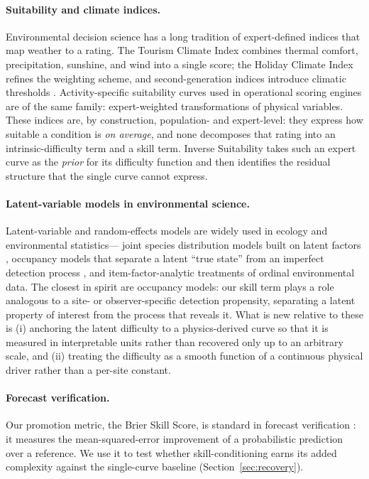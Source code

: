 \paragraph{Suitability and climate indices.} Environmental decision science has a
long tradition of expert-defined indices that map weather to a rating. The Tourism
Climate Index \citep{mieczkowski1985} combines thermal comfort, precipitation,
sunshine, and wind into a single score; the Holiday Climate Index
\citep{scott2016} refines the weighting scheme, and second-generation indices
introduce climatic thresholds \citep{defreitas2008}. Activity-specific suitability
curves used in operational scoring engines are of the same family: expert-weighted
transformations of physical variables. These indices are, by construction,
population- and expert-level: they express how suitable a condition is
\emph{on average}, and none decomposes that rating into an intrinsic-difficulty
term and a skill term. Inverse Suitability takes such an expert curve as the
\emph{prior} for its difficulty function and then identifies the residual
structure that the single curve cannot express.

\paragraph{Latent-variable models in environmental science.} Latent-variable and
random-effects models are widely used in ecology and environmental statistics---
joint species distribution models built on latent factors \citep{warton2015},
occupancy models that separate a latent ``true state'' from an imperfect detection
process \citep{mackenzie2002}, and item-factor-analytic treatments of ordinal
environmental data. The closest in spirit are occupancy models: our skill term
plays a role analogous to a site- or observer-specific detection propensity,
separating a latent property of interest from the process that reveals it. What is
new relative to these is (i) anchoring the latent difficulty to a physics-derived
curve so that it is measured in interpretable units rather than recovered only up
to an arbitrary scale, and (ii) treating the difficulty as a smooth function of a
continuous physical driver rather than a per-site constant.

\paragraph{Forecast verification.} Our promotion metric, the Brier Skill Score,
is standard in forecast verification \citep{brier1950}: it measures the
mean-squared-error improvement of a probabilistic prediction over a reference. We
use it to test whether skill-conditioning earns its added complexity against the
single-curve baseline (Section~\ref{sec:recovery}).
